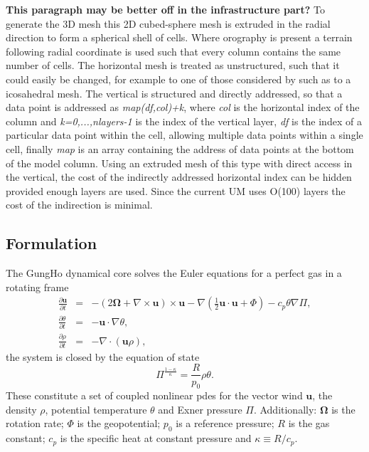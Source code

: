 \documentclass[times]{elsarticle}
\begin{document}
\textbf{This paragraph may be better off in the infrastructure part?}
To generate the 3D mesh this 2D cubed-sphere mesh is extruded in the radial 
direction to form a spherical shell of cells. Where orography is present a terrain
following radial coordinate is used such that every column contains the
same number of cells. The horizontal mesh is treated as unstructured,
such that it could easily be changed, for example to one of those considered 
by \citet{staniforth2012} such as to a icosahedral mesh.
The vertical is structured and directly addressed, so that
a data point is addressed as \textit{map(df,col)+k}, where \textit{col}
is the horizontal index of the column and \textit{k=0,...,nlayers-1} is
the index of the vertical layer, \textit{df} is the index of a particular
data point within the cell, allowing multiple data points within a single cell, 
finally \textit{map} is an array containing the address of data points at 
the bottom of the model column.
Using an extruded mesh of this type with direct access in the vertical, the cost
of the indirectly addressed horizontal index can be hidden \citet{gmd-9-3803-2016} 
provided enough layers are used. Since the current UM uses O(100) layers the 
cost of the indirection is minimal.
%

\subsection{Formulation\label{sec:sub:formulation}}
The GungHo dynamical core solves the Euler equations for a perfect gas in a 
rotating frame
%
\begin{eqnarray}
\frac{\partial\mathbf{u}}{\partial t} & = & -\left(2\bm{\Omega}+\nabla\times\mathbf{u}\right)\times\mathbf{u} - \nabla\left(\frac{1}{2}\mathbf{u}\cdot\mathbf{u} + \Phi\right) - c_p\theta\nabla\Pi,\label{eq:momentum}\\
\frac{\partial\theta}{\partial t} & = & - \mathbf{u}\cdot\nabla\theta,\label{eq:energy}\\
\frac{\partial\rho}{\partial t} & = & - \nabla\cdot\left(\mathbf{u}\rho\right)\label{eq:continuity},
\end{eqnarray}
%
the system is closed by the equation of state
%
\begin{equation}
\Pi^{\frac{1-\kappa}{\kappa}} = \frac{R}{p_0}\rho\theta.\label{eq:eos}
\end{equation}
%
These constitute a set of coupled nonlinear pdes for the vector wind $\mathbf{u}$, 
the density $\rho$, potential temperature $\theta$ and Exner pressure $\Pi$. 
Additionally: $\bm{\Omega}$ is the rotation rate; $\Phi$ is the geopotential; 
$p_0$ is a reference pressure; $R$ is the gas constant; $c_p$ is the specific 
heat at constant pressure and $\kappa\equiv R/c_p$.
\end{document}
